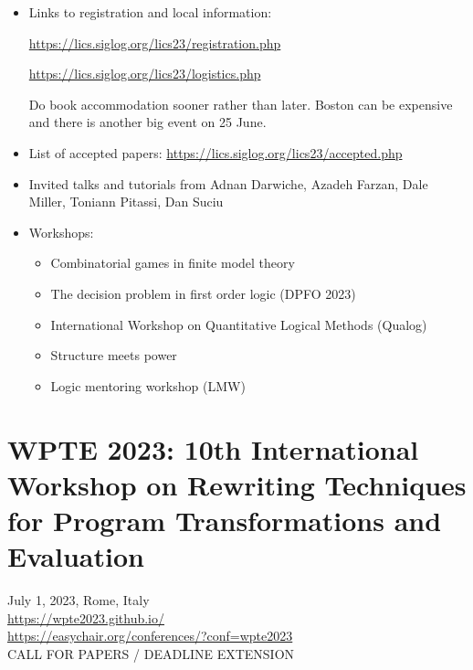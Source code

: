 \documentclass[prodmode,acmtecs]{acmsmall} %
\begin{document}
\begin{itemize}\item  Links to registration and local information: 
 
  \href{https://lics.siglog.org/lics23/registration.php}{https://lics.siglog.org/lics23/registration.php} 
 
  \href{https://lics.siglog.org/lics23/logistics.php}{https://lics.siglog.org/lics23/logistics.php} 
 
  Do book accommodation sooner rather than later. Boston can be expensive and there is another big event on 25 June.  
 
\item  List of accepted papers: \href{https://lics.siglog.org/lics23/accepted.php}{https://lics.siglog.org/lics23/accepted.php} 
 
\item  Invited talks and tutorials from Adnan Darwiche, Azadeh Farzan, Dale Miller, Toniann Pitassi, Dan Suciu 
 
\item  Workshops: 
 
\begin{itemize}\item  Combinatorial games in finite model theory
\item  The decision problem in first order logic (DPFO 2023)
\item  International Workshop on Quantitative Logical Methods (Qualog) 
\item  Structure meets power
\item  Logic mentoring workshop (LMW)
\end{itemize} 
\end{itemize}\section{WPTE 2023: 10th International Workshop on Rewriting Techniques for Program Transformations and Evaluation}\label{WPTE2023}  July 1, 2023, Rome, Italy\\ 
  \href{https://wpte2023.github.io/}{https://wpte2023.github.io/}\\ 
  \href{https://easychair.org/conferences/?conf=wpte2023}{https://easychair.org/conferences/?conf=wpte2023}\\ 
CALL FOR PAPERS / DEADLINE EXTENSION 
\end{document}

